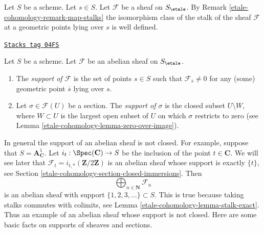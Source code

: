 Let $S$ be a scheme. Let $s \in S$.
Let $\mathcal{F}$ be a sheaf on $S_\etale$. By
Remark \ref{etale-cohomology-remark-map-stalks}
the isomorphism class of the stalk of the sheaf $\mathcal{F}$
at a geometric points lying over $s$ is well defined.

\begin{definition}[Support]
\label{etale-cohomology-definition-support}
\href{https://stacks.math.columbia.edu/tag/04FS}{\texttt{Stacks tag 04FS}}

Let $S$ be a scheme.
Let $\mathcal{F}$ be an abelian sheaf on $S_\etale$.
\begin{enumerate}
\item The {\it support of $\mathcal{F}$} is the set of
points $s \in S$ such that $\mathcal{F}_{\overline{s}} \not = 0$
for any (some) geometric point $\overline{s}$ lying over $s$.
\item Let $\sigma \in \mathcal{F}(U)$ be a section.
The {\it support of $\sigma$} is the closed subset $U \setminus W$, where
$W \subset U$ is the largest open subset of $U$ on which $\sigma$
restricts to zero (see
Lemma \ref{etale-cohomology-lemma-zero-over-image}).
\end{enumerate}
\end{definition}

In general the support of an abelian sheaf is not closed.
For example, suppose that $S = \mathbf{A}^1_{\mathbf{C}}$.
Let $i_t : \Spec(\mathbf{C}) \to S$ be the inclusion of the
point $t \in \mathbf{C}$.
We will see later that $\mathcal{F}_t = i_{t, *}(\mathbf{Z}/2\mathbf{Z})$
is an abelian sheaf whose support is exactly $\{t\}$, see
Section \ref{etale-cohomology-section-closed-immersions}.
Then
$$
\bigoplus\nolimits_{n \in \mathbf{N}} \mathcal{F}_n
$$
is an abelian sheaf with support $\{1, 2, 3, \ldots\} \subset S$.
This is true because taking stalks commutes with colimits, see
Lemma \ref{etale-cohomology-lemma-stalk-exact}.
Thus an example of an abelian sheaf whose support is not closed.
Here are some basic facts on supports of sheaves and sections.

